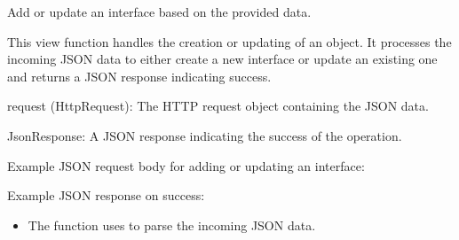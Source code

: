 \documentclass[letterpaper,10pt,english]{sphinxmanual}
\begin{document}
\begin{fulllineitems}
\label{\detokenize{app:app.views.update_interface}}
\pysigstartsignatures
{}
\pysigstopsignatures
\sphinxAtStartPar
Add or update an interface based on the provided data.

\sphinxAtStartPar
This view function handles the creation or updating of an  object. 
It processes the incoming JSON data to either create a new interface or update an existing one 
and returns a JSON response indicating success.
\begin{description}
\sphinxAtStartPar
request (HttpRequest): The HTTP request object containing the JSON data.

\sphinxAtStartPar
JsonResponse: A JSON response indicating the success of the operation.

\sphinxAtStartPar
Example JSON request body for adding or updating an interface:

\begin{sphinxVerbatim}[commandchars=\\\{\}]
\end{sphinxVerbatim}

\sphinxAtStartPar
Example JSON response on success:

\begin{sphinxVerbatim}[commandchars=\\\{\}]
\end{sphinxVerbatim}

\begin{itemize}
\item {} 
\sphinxAtStartPar
The function uses  to parse the incoming JSON data.


\end{itemize}
\end{description}
\end{fulllineitems}
\end{document}
